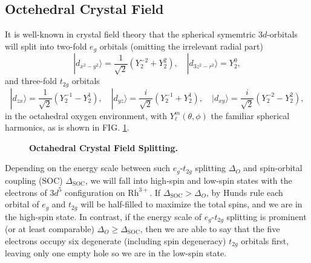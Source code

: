 \documentclass[10pt,nofootinbib,letterpaper]{revtex4}
\begin{document}
	\subsection{Octehedral Crystal Field}
		It is well-known in crystal field theory \cite{fazekas1999lecture} that the spherical symemtric $3d$-orbitals will split into two-fold $e_g$ orbitals (omitting the irrelevant radial part)
		\begin{equation*}
			|d_{x^2-y^2}\rangle=\dfrac{1}{\sqrt 2}(Y_2^{-2}+Y_2^2),\quad|d_{3z^2-r^2}\rangle=Y^0_2,
		\end{equation*}
		and three-fold $t_{2g}$ orbitals
		\begin{equation*}
			|d_{zx}\rangle=\dfrac{1}{\sqrt 2}(Y_2^{-1}-Y^1_2),\quad|d_{yz}\rangle=\dfrac{i}{\sqrt 2}(Y_2^{-1}+Y^1_2),\quad|d_{xy}\rangle=\dfrac{i}{\sqrt 2}(Y_2^{-2}-Y^2_2),
		\end{equation*}
		in the octahedral oxygen environment, with $Y_\ell^m(\theta,\phi)$ the familiar spherical harmonics, as is shown in FIG. \ref{fig:t2g-eg}.\par
		\begin{figure}[!htp]
			\centering
			\caption{\bf Octahedral Crystal Field Splitting.}
			\label{fig:t2g-eg}
		\end{figure}
		
		Depending on the energy scale between such $e_g$-$t_{2g}$ splitting $\Delta_O$ and spin-orbital coupling (SOC) $\Delta_{\text{SOC}}$, we will fall into high-spin and low-spin states with the electrons of $3d^5$ configuration on $\mathrm{Rh}^{3+}$. If $\Delta_{\text{SOC}}>\Delta_O$, by Hunds rule each orbital of $e_g$ and $t_{2g}$ will be half-filled to maximize the total spins, and we are in the high-spin state. In contrast, if the energy scale of $e_g$-$t_{2g}$ splitting is prominent (or at least comparable) $\Delta_O\geq\Delta_{\text{SOC}}$, then we are able to say that the five electrons occupy six degenerate (including spin degeneracy) $t_{2g}$ orbitals first, leaving only one empty hole so we are in the low-spin state.\par
\end{document}
